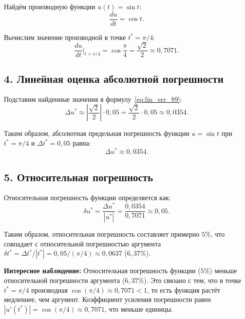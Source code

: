\documentclass{article}
\begin{document}
Найдём производную функции $u(t) = \sin t$:
\begin{equation}
\frac{du}{dt} = \cos t.
\end{equation}

Вычислим значение производной в точке $t^* = \pi/4$:
\begin{equation}
\frac{du}{dt}\bigg|_{t = \pi/4} = \cos\frac{\pi}{4} = \frac{\sqrt{2}}{2} \approx 0{,}7071.
\end{equation}

\subsection*{4. Линейная оценка абсолютной погрешности}

Подставим найденные значения в формулу~\eqref{eq:lin_err_89}:
\begin{equation}
\Delta u^* \approx \left|\frac{\sqrt{2}}{2}\right| \cdot 0{,}05 = \frac{\sqrt{2}}{2} \cdot 0{,}05 \approx 0{,}0354.
\end{equation}

Таким образом, абсолютная предельная погрешность функции $u = \sin t$ при $t^* = \pi/4$ и $\Delta t^* = 0{,}05$ равна:
\begin{equation}
\boxed{\Delta u^* \approx 0{,}0354.}
\end{equation}

\subsection*{5. Относительная погрешность}

Относительная погрешность функции определяется как:
\begin{equation}
\delta u^* = \frac{\Delta u^*}{|u^*|} = \frac{0{,}0354}{0{,}7071} \approx 0{,}05.
\end{equation}

Таким образом, относительная погрешность составляет примерно $5\%$, что совпадает с относительной погрешностью аргумента $\delta t^* = \Delta t^*/|t^*| = 0{,}05/(\pi/4) \approx 0{,}0637$ ($6{,}37\%$).

\textbf{Интересное наблюдение:} Относительная погрешность функции ($5\%$) меньше относительной погрешности аргумента ($6{,}37\%$). Это связано с тем, что в точке $t^* = \pi/4$ производная $\cos(\pi/4) \approx 0{,}7071 < 1$, то есть функция растёт медленнее, чем аргумент. Коэффициент усиления погрешности равен $|u'(t^*)| = \cos(\pi/4) \approx 0{,}7071$, что меньше единицы.
\end{document}
